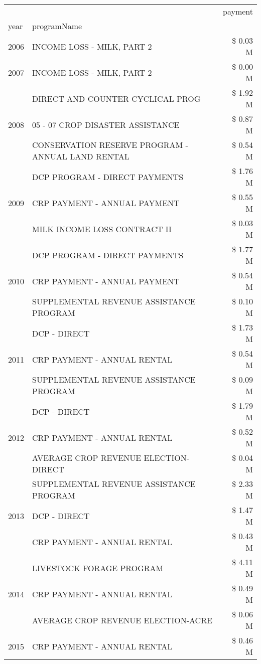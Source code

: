 \begin{tabular}{llr}
\toprule
 &  & payment \\
year & programName &  \\
\midrule
2006 & INCOME LOSS - MILK, PART 2 & \$ 0.03 M \\
\cline{1-3}
2007 & INCOME LOSS - MILK, PART 2 & \$ 0.00 M \\
\cline{1-3}
\multirow[t]{3}{*}{2008} & DIRECT AND COUNTER CYCLICAL PROG & \$ 1.92 M \\
 & 05 - 07 CROP DISASTER ASSISTANCE & \$ 0.87 M \\
 & CONSERVATION RESERVE PROGRAM - ANNUAL LAND RENTAL & \$ 0.54 M \\
\cline{1-3}
\multirow[t]{3}{*}{2009} & DCP PROGRAM - DIRECT PAYMENTS & \$ 1.76 M \\
 & CRP PAYMENT - ANNUAL PAYMENT & \$ 0.55 M \\
 & MILK INCOME LOSS CONTRACT II & \$ 0.03 M \\
\cline{1-3}
\multirow[t]{3}{*}{2010} & DCP PROGRAM - DIRECT PAYMENTS & \$ 1.77 M \\
 & CRP PAYMENT - ANNUAL PAYMENT & \$ 0.54 M \\
 & SUPPLEMENTAL REVENUE ASSISTANCE PROGRAM & \$ 0.10 M \\
\cline{1-3}
\multirow[t]{3}{*}{2011} & DCP - DIRECT & \$ 1.73 M \\
 & CRP PAYMENT - ANNUAL RENTAL & \$ 0.54 M \\
 & SUPPLEMENTAL REVENUE ASSISTANCE PROGRAM & \$ 0.09 M \\
\cline{1-3}
\multirow[t]{3}{*}{2012} & DCP - DIRECT & \$ 1.79 M \\
 & CRP PAYMENT - ANNUAL RENTAL & \$ 0.52 M \\
 & AVERAGE CROP REVENUE ELECTION-DIRECT & \$ 0.04 M \\
\cline{1-3}
\multirow[t]{3}{*}{2013} & SUPPLEMENTAL REVENUE ASSISTANCE PROGRAM & \$ 2.33 M \\
 & DCP - DIRECT & \$ 1.47 M \\
 & CRP PAYMENT - ANNUAL RENTAL & \$ 0.43 M \\
\cline{1-3}
\multirow[t]{3}{*}{2014} & LIVESTOCK FORAGE PROGRAM & \$ 4.11 M \\
 & CRP PAYMENT - ANNUAL RENTAL & \$ 0.49 M \\
 & AVERAGE CROP REVENUE ELECTION-ACRE & \$ 0.06 M \\
\cline{1-3}
\multirow[t]{3}{*}{2015} & CRP PAYMENT - ANNUAL RENTAL & \$ 0.46 M \\

\end{tabular}
